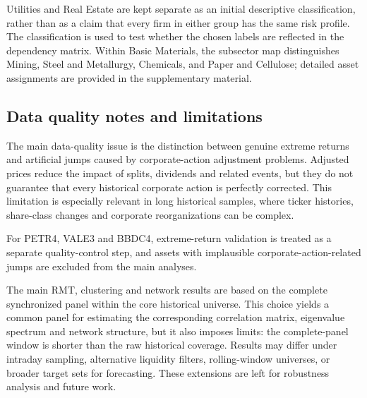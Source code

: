 Utilities and Real Estate are kept separate as an initial descriptive classification, rather than as a claim that every firm in either group has the same risk profile. The classification is used to test whether the chosen labels are reflected in the dependency matrix. Within Basic Materials, the subsector map distinguishes Mining, Steel and Metallurgy, Chemicals, and Paper and Cellulose; detailed asset assignments are provided in the supplementary material.

\subsection{Data quality notes and limitations}

The main data-quality issue is the distinction between genuine extreme returns and artificial jumps caused by corporate-action adjustment problems. Adjusted prices reduce the impact of splits, dividends and related events, but they do not guarantee that every historical corporate action is perfectly corrected. This limitation is especially relevant in long historical samples, where ticker histories, share-class changes and corporate reorganizations can be complex.

For PETR4, VALE3 and BBDC4, extreme-return validation is treated as a separate quality-control step, and assets with implausible corporate-action-related jumps are excluded from the main analyses.

The main RMT, clustering and network results are based on the complete synchronized panel within the core historical universe. This choice yields a common panel for estimating the corresponding correlation matrix, eigenvalue spectrum and network structure, but it also imposes limits: the complete-panel window is shorter than the raw historical coverage. Results may differ under intraday sampling, alternative liquidity filters, rolling-window universes, or broader target sets for forecasting. These extensions are left for robustness analysis and future work.
